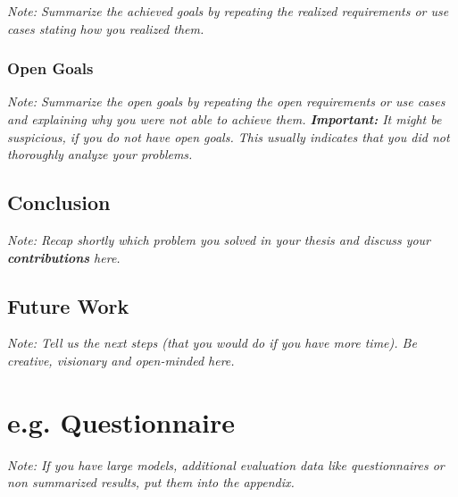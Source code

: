 \textit{Note: Summarize the achieved goals by repeating the realized requirements or use cases stating how you realized them.}

\subsection{Open Goals}

\textit{Note: Summarize the open goals by repeating the open requirements or use cases and explaining why you were not able to achieve them. \textbf{Important:} It might be suspicious, if you do not have open goals. This usually indicates that you did not thoroughly analyze your problems.}

\section{Conclusion}

\textit{Note: Recap shortly which problem you solved in your thesis and discuss your \textbf{contributions} here.}

\section{Future Work}

\textit{Note: Tell us the next steps  (that you would do if you have more time). Be creative, visionary and open-minded here.}



\appendix

\chapter{e.g. Questionnaire}

\textit{Note: If you have large models, additional evaluation data like questionnaires or non summarized results, put them into the appendix.}


\clearpage

\listoffigures
\clearpage

\listoftables
\clearpage





